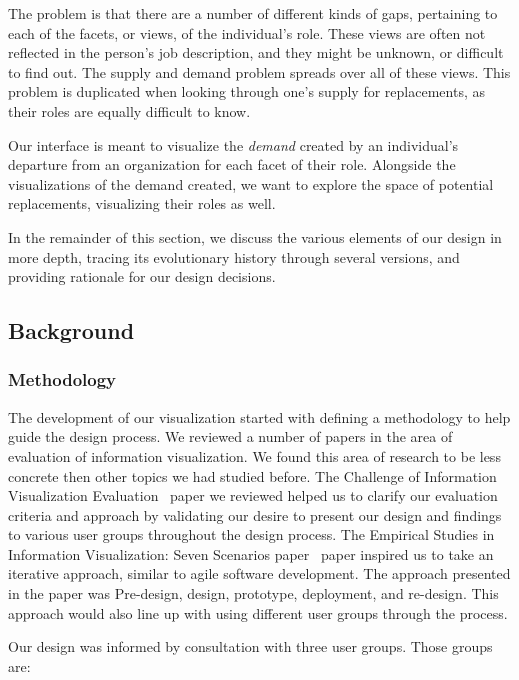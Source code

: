 \documentclass[journal]{vgtc}                %
\begin{document}
The problem is that there are a number of different kinds of gaps, pertaining to each of the facets, or views, of the individual's role. These views are often not reflected in the person's job description, and they might be unknown, or difficult to find out. The supply and demand problem spreads over all of these views. This problem is duplicated when looking through one's supply for replacements, as their roles are equally difficult to know.

Our interface is meant to visualize the \emph{demand} created by an individual's departure from an organization for each facet of their role. Alongside the visualizations of the demand created, we want to explore the space of potential replacements, visualizing their roles as well.

In the remainder of this section, we discuss the various elements of our design in more depth, tracing its evolutionary history through several versions, and providing rationale for our design decisions.

\subsection{Background}


\subsubsection{Methodology}
\label{sec:methodology}

The development of our visualization started with defining a methodology to help guide the design process.  We reviewed a number of papers in the area of evaluation of information visualization.  We found this area of research to be less concrete then other topics we had studied before.  The Challenge of Information Visualization Evaluation~\cite{challengeofinfoviseval} paper we reviewed helped us to clarify our evaluation criteria and approach by validating our desire to present our design and findings to various user groups throughout the design process.  The Empirical Studies in Information Visualization: Seven Scenarios paper~\cite{lam2012empirical} paper inspired us to take an iterative approach, similar to agile software development.  The approach presented in the paper was Pre-design, design, prototype, deployment, and re-design.  This approach would also line up with using different user groups through the process.

Our design was informed by consultation with three user groups. Those groups are:
\end{document}

